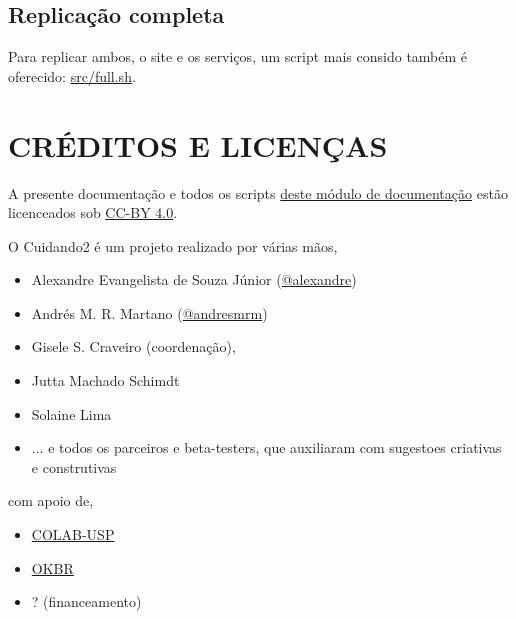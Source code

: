 \documentclass[letterpaper,10pt,brazil]{sphinxmanual}
\begin{document}
\section{Replicação completa}
\label{index:replicacao-completa}
Para replicar ambos, o site e os serviços, um script mais consido também
é oferecido: \href{https://github.com/okfn-brasil/cuidando2-doc/blob/master/src/full.sh}{src/full.sh}.


\chapter{CRÉDITOS E LICENÇAS}
\label{index:creditos-e-licencas}
A presente documentação e todos os scripts \href{https://github.com/okfn-brasil/cuidando2-doc}{deste módulo de
documentação} estão
licenceados sob \href{http://creativecommons.org/licenses/by/4.0/}{CC-BY 4.0}.

O Cuidando2 é um projeto realizado por várias mãos,
\begin{itemize}
\item {} 
Alexandre Evangelista de Souza Júnior
(\href{https://github.com/alexandre}{@alexandre})

\item {} 
Andrés M. R. Martano (\href{https://github.com/andresmrm}{@andresmrm})

\item {} 
Gisele S. Craveiro (coordenação),

\item {} 
Jutta Machado Schimdt

\item {} 
Solaine Lima

\item {} 
... e todos os parceiros e beta-testers, que  auxiliaram com sugestoes criativas e construtivas

\end{itemize}

com apoio de,
\begin{itemize}
\item {} 
\href{http://colab.each.usp.br/}{COLAB-USP}

\item {} 
\href{http://br.okfn.org/}{OKBR}

\item {} 
? (financeamento)

\end{itemize}
\end{document}
